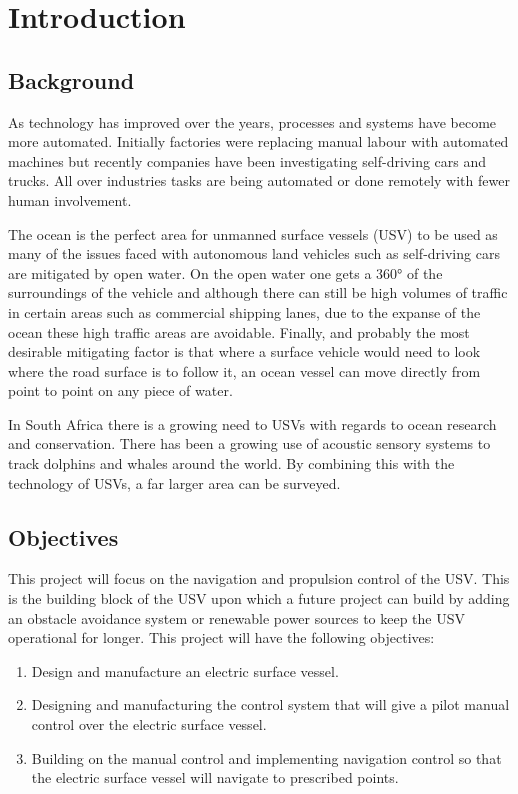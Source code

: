 \chapter{Introduction}
\section{Background}
As technology has improved over the years, processes and systems have become more automated. Initially factories were replacing manual labour with automated machines but recently companies have been investigating self-driving cars and trucks. All over industries tasks are being automated or done remotely with fewer human involvement. \par
\vspace{0.6cm}
The ocean is the perfect area for unmanned surface vessels (USV) to be used as many of the issues faced with autonomous land vehicles such as self-driving cars are mitigated by open water. On the open water one gets a 360° of the surroundings of the vehicle and although there can still be high volumes of traffic in certain areas such as commercial shipping lanes, due to the expanse of the ocean these high traffic areas are avoidable. Finally, and probably the most desirable mitigating factor is that where a surface vehicle would need to look where the road surface is to follow it, an ocean vessel can move directly from point to point on any piece of water. \par
\vspace{0.6cm}
In South Africa there is a growing need to USVs with regards to ocean research and conservation. There has been a growing use of acoustic sensory systems to track dolphins and whales around the world. By combining this with the technology of USVs, a far larger area can be surveyed. \par
\section{Objectives}
This project will focus on the navigation and propulsion control of the USV. This is the building block of the USV upon which a future project can build by adding an obstacle avoidance system or renewable power sources to keep the USV operational for longer. This project will have the following objectives:
\begin{enumerate}
	\item Design and manufacture an electric surface vessel.
	\item Designing and manufacturing the control system that will give a pilot manual control over the electric surface vessel.
	\item Building on the manual control and implementing navigation control so that the electric surface vessel will navigate to prescribed points.
\end{enumerate}
